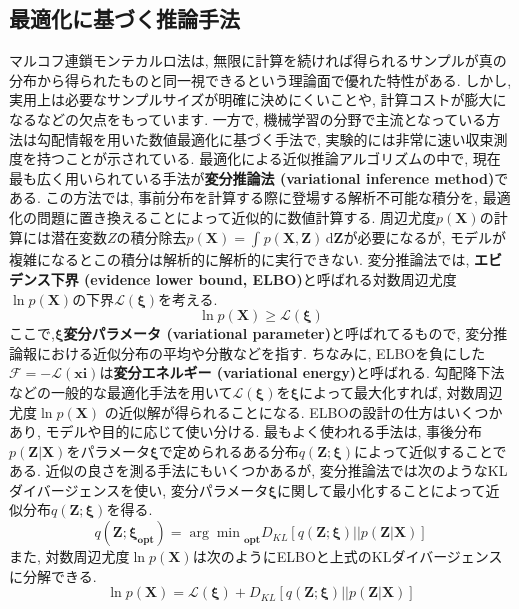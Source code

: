 \documentclass[twocolumn]{jarticle}
\begin{document}
\subsection{最適化に基づく推論手法}
マルコフ連鎖モンテカルロ法は, 無限に計算を続ければ得られるサンプルが真の分布から得られたものと同一視できるという理論面で優れた特性がある. しかし, 実用上は必要なサンプルサイズが明確に決めにくいことや, 計算コストが膨大になるなどの欠点をもっています. 一方で, 機械学習の分野で主流となっている方法は勾配情報を用いた数値最適化に基づく手法で, 実験的には非常に速い収束測度を持つことが示されている.
最適化による近似推論アルゴリズムの中で, 現在最も広く用いられている手法が{\bf 変分推論法 (variational inference method)}である. この方法では, 事前分布を計算する際に登場する解析不可能な積分を, 最適化の問題に置き換えることによって近似的に数値計算する. 周辺尤度${p(\bm {X})}$の計算には潜在変数${Z}$の積分除去${p(\bm {X}) = \int_{}^{} p(\bm {X, Z}) \,\mathrm{d}{\bm {Z}} }$が必要になるが, モデルが複雑になるとこの積分は解析的に解析的に実行できない. 変分推論法では, {\bf エビデンス下界 (evidence lower bound, ELBO)}と呼ばれる対数周辺尤度${\ln p(\bm {X})}$の下界${\mathcal{L} (\bm {\xi })}$を考える.
\begin{equation}
  \ln p(\bm {X}) \geq \mathcal{L}(\bm {\xi})
\end{equation}
ここで,${\bm {\xi}}${\bf 変分パラメータ (variational parameter)}と呼ばれてるもので, 変分推論報における近似分布の平均や分散などを指す. ちなみに, ELBOを負にした${\mathcal{F} = -\mathcal{L}(\bm {xi})}$は{\bf 変分エネルギー (variational energy)}と呼ばれる. 勾配降下法などの一般的な最適化手法を用いて${\mathcal{L}(\bm {\xi})}$を${\bm {\xi}}$によって最大化すれば, 対数周辺尤度${\ln p(\bm {X})}$ の近似解が得られることになる.
ELBOの設計の仕方はいくつかあり, モデルや目的に応じて使い分ける. 最もよく使われる手法は, 事後分布${p(\bm{Z|X})}$をパラメータ${\bm {\xi}}$で定められるある分布${q(\bm {Z;\xi})}$によって近似することである. 近似の良さを測る手法にもいくつかあるが, 変分推論法では次のようなKLダイバージェンスを使い, 変分パラメータ${\bm {\xi}}$に関して最小化することによって近似分布${q(\bm {Z;\xi})}$を得る.
\begin{equation}
  q(\bm {Z;\xi_{opt}}) = {\arg\min}_{\bm {opt}} D_{KL}[q(\bm {Z;\xi})||p(\bm {Z|X})]
\end{equation}
また, 対数周辺尤度${\ln p(\bm {X})}$は次のようにELBOと上式のKLダイバージェンスに分解できる.
\begin{equation}
  \ln p(\bm {X}) = \mathcal{L}(\bm {\xi}) + D_{KL}[q(\bm {Z;\xi})||p(\bm {Z|X})]
\end{equation}
\end{document}
